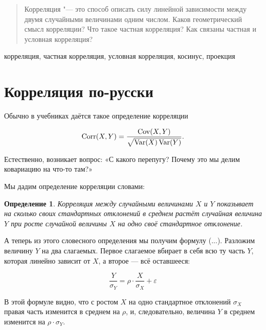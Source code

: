 \documentclass[10pt]{article}
\begin{document}


\DoFirstPageTechnicalStuff


\newtheorem{theorem}{Теорема}
\newtheorem{definition}{Определение}

\begin{abstract}
Корреляция "--- это способ описать силу линейной зависимости между двумя случайными величинами одним числом. Каков геометрический смысл корреляции? Что такое частная корреляция? Как связаны частная и условная корреляция? 
\end{abstract}

\begin{keyword}
корреляция, частная корреляция, условная корреляция, косинус, проекция
\end{keyword}



\section{Корреляция по-русски}

Обычно в учебниках даётся такое определение корреляции

\[
\operatorname{Corr}(X,Y)=\frac{\operatorname{Cov}(X,Y)}{\sqrt{\operatorname{Var}(X)\operatorname{Var}(Y)}}.
\]

Естественно, возникает вопрос: «С какого перепугу? Почему это мы делим ковариацию на что-то там?»

Мы дадим определение корреляции словами:

\begin{definition}
Корреляция между случайными величинами $X$ и $Y$ показывает на сколько своих стандартных отклонений в среднем растёт случайная величина $Y$ при росте случайной величины $X$ на одно своё стандартное отклонение.
\end{definition}

А теперь из этого словесного определения мы получим формулу (...). Разложим величину $Y$ на два слагаемых. Первое слагаемое вбирает в себя всю ту часть $Y$, которая линейно зависит от $X$, а второе --- всё оставшееся:

\[
\frac{Y}{\sigma_Y}=\rho \cdot \frac{X}{\sigma_X} + \varepsilon
\]

В этой формуле видно, что с ростом $X$ на одно стандартное отклонений $\sigma_X$ правая часть изменится в среднем на $\rho$, и, следовательно, величина $Y$ в среднем изменится на $\rho \cdot \sigma_Y$. 
\end{document}
